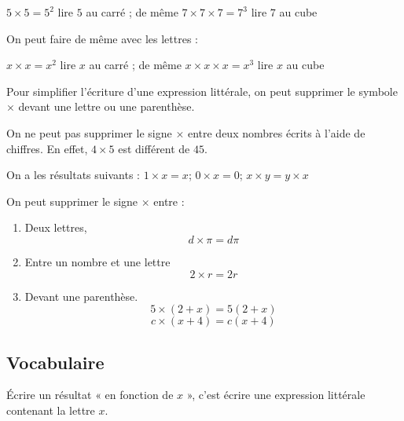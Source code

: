 \documentclass[a4paper,10pt]{report}
\begin{document}
\vspace{-2mm}
\noindent \begin{minipage}{11cm}
\begin{defn}
$5 \times 5 = 5^2$ lire \og $5$ au carré \fg{} ; \quad de même $7 \times 7\times 7 = 7^3$ lire \og $7$ au cube \fg{}

\medskip
\noindent On peut faire de même avec les lettres :

\noindent $x \times x = x^2$ lire \og $x$ au carré \fg{} ; \quad de même $x \times x \times x = x^3$ lire \og $x$ au cube \fg{}
\end{defn}

\begin{memento}
Pour simplifier l'écriture d'une expression littérale, on peut supprimer le symbole \og $\times$ \fg{} devant une lettre ou une parenthèse.
\end{memento}

\begin{rem}
On ne peut pas supprimer le signe \og $\times$ \fg{} entre deux nombres écrits à l'aide de chiffres.
En effet, $4 \times 5$ est différent de $45$.

\medskip
\noindent On a les résultats suivants : \quad $1 \times x = x$; \quad $0 \times x = 0$; \quad $x \times y = y \times x$
\end{rem}

\end{minipage}
\hspace{3mm}
\begin{minipage}{7cm}
\begin{ex}
On peut supprimer le signe $\times$ entre :
\begin{enumerate}
\item[•]Deux lettres, $$d \times \pi = d \pi$$
\item[•]Entre un nombre et une lettre $$2 \times r = 2 r$$
\item[•]Devant une parenthèse. $$5 \times (2 + x) = 5 (2 + x)$$
$$c \times (x + 4) = c(x + 4)$$
\end{enumerate}
\end{ex}
\end{minipage}

\subsection{Vocabulaire}

\vspace{-2mm}
\begin{defn}
Écrire un résultat « en fonction de $x$ », c'est écrire une expression littérale
contenant la lettre $x$.
\end{defn}
\end{document}
